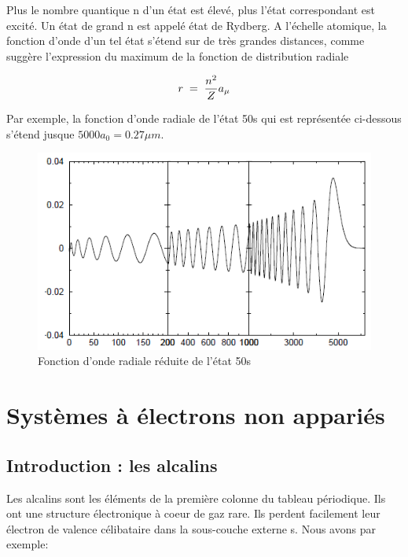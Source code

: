 \vspace{0.2cm}

Plus le nombre quantique n d'un état est élevé, plus l'état correspondant est excité. Un état de grand n est appelé état de Rydberg. A l'échelle atomique, la fonction d'onde d'un tel état s'étend sur de très grandes distances, comme suggère l'expression du maximum de la fonction de distribution radiale

\begin{equation*}
    r\; = \; \dfrac{n^2}{Z}a_{\mu}
\end{equation*}

Par exemple, la fonction d'onde radiale de l'état 50s qui est représentée ci-dessous s'étend jusque $5000a_0=0.27\mu m$.

\begin{figure}[tph]
    \centering
    \includegraphics{Images2/50s.PNG}
    \caption{Fonction d'onde radiale réduite de l'état 50s}
\end{figure}





\newpage

\section{Systèmes à électrons non appariés}
\subsection{Introduction : les alcalins}

Les alcalins sont les éléments de la première colonne du tableau périodique. Ils ont une structure électronique à coeur de gaz rare. Ils perdent facilement leur électron de valence célibataire dans la sous-couche externe s. Nous avons par exemple:

